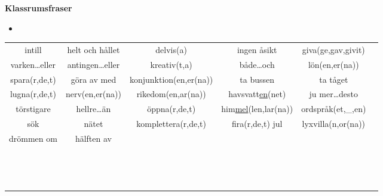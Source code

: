 
\begin{flushleft}
    \textbf{Klassrumsfraser}
    \begin{itemize}
        \item 
    \end{itemize}
\end{flushleft}

\begin{center}
    \begin{adjustwidth}{-2.5cm}{}
        \begin{tabular}{|c c c c c c|}
            \hline
            intill & helt och hållet & delvis(a) & ingen åsikt & giva(ge,gav,givit) &  \\
            varken\ldots eller & antingen\ldots eller & kreativ(t,a) & både\ldots och & lön(en,er(na)) &  \\
            spara(r,de,t) & göra av med & konjunktion(en,er(na)) & ta bussen & ta tåget &  \\
            lugna(r,de,t) & nerv(en,er(na)) & rikedom(en,ar(na)) & havsvatt\underline{en}(net) & ju mer\ldots desto &  \\
            törstigare & hellre\ldots än & öppna(r,de,t) & him\underline{mel}(len,lar(na)) & ordspråk(et,\_,en) &  \\
            sök & nätet & komplettera(r,de,t) & fira(r,de,t) jul & lyxvilla(n,or(na)) &  \\
            drömmen om & hälften av &  &  &  &  \\
             &  &  &  &  &  \\
             &  &  &  &  &  \\
             &  &  &  &  &  \\
             &  &  &  &  &  \\
             &  &  &  &  &  \\
             &  &  &  &  &  \\
             &  &  &  &  &  \\
             &  &  &  &  &  \\
             &  &  &  &  &  \\
             &  &  &  &  &  \\
             &  &  &  &  &  \\
             &  &  &  &  &  \\
             &  &  &  &  &  \\
             &  &  &  &  &  \\

\end{tabular}
\end{adjustwidth}
\end{center}
